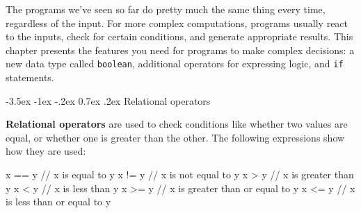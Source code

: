 \documentclass[12pt]{book}
\makeatletter
\renewcommand{\section}{\@startsection {section}{1}{\z@}%
    {-3.5ex \@plus -1ex \@minus -.2ex}%
    {0.7ex \@plus.2ex}%
    {\normalfont\Large\bfseries}}
\theoremstyle{exercise}
\newcommand{\java}[1]{\lstinline{#1}} %
\makeatother
\begin{document}


The programs we've seen so far do pretty much the same thing every time, regardless of the input.
For more complex computations, programs usually react to the inputs, check for certain conditions, and generate appropriate results.
This chapter presents the features you need for programs to make complex decisions: a new data type called \java{boolean}, additional operators for expressing logic, and \java{if} statements.




\section{Relational operators}


{\bf Relational operators} are used to check conditions like whether two values are equal, or whether one is greater than the other.
The following expressions show how they are used:

\begin{code}
    x == y          // x is equal to y
    x != y          // x is not equal to y
    x > y           // x is greater than y
    x < y           // x is less than y
    x >= y          // x is greater than or equal to y
    x <= y          // x is less than or equal to y
\end{code}
\end{document}
